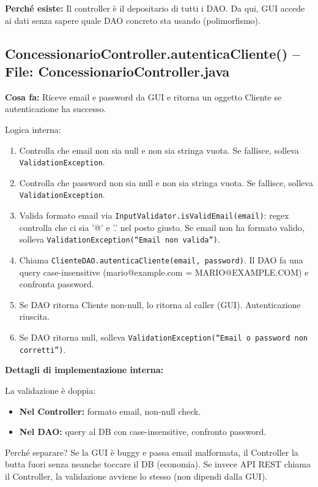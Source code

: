 \documentclass[12pt,a4paper]{article}
\begin{document}
\textbf{Perché esiste:}
Il controller è il depositario di tutti i DAO. Da qui, GUI accede ai dati senza sapere quale DAO concreto sta usando (polimorfismo).

\subsection{ConcessionarioController.autenticaCliente() -- File: ConcessionarioController.java}

\textbf{Cosa fa:}
Riceve email e password da GUI e ritorna un oggetto Cliente se autenticazione ha successo.

Logica interna:
\begin{enumerate}
  \item Controlla che email non sia null e non sia stringa vuota. Se fallisce, solleva \texttt{ValidationException}.
  \item Controlla che password non sia null e non sia stringa vuota. Se fallisce, solleva \texttt{ValidationException}.
  \item Valida formato email via \texttt{InputValidator.isValidEmail(email)}: regex controlla che ci sia '@' e '.' nel posto giusto.
    Se email non ha formato valido, solleva \texttt{ValidationException(``Email non valida'')}.
  \item Chiama \texttt{ClienteDAO.autenticaCliente(email, password)}.
    Il DAO fa una query case-insensitive (mario@example.com = MARIO@EXAMPLE.COM) e confronta password.
  \item Se DAO ritorna Cliente non-null, lo ritorna al caller (GUI). Autenticazione riuscita.
  \item Se DAO ritorna null, solleva \texttt{ValidationException(``Email o password non corretti'')}.
\end{enumerate}

\textbf{Dettagli di implementazione interna:}

La validazione è doppia:
\begin{itemize}
  \item \textbf{Nel Controller:} formato email, non-null check.
  \item \textbf{Nel DAO:} query al DB con case-insensitive, confronto password.
\end{itemize}

Perché separare? Se la GUI è buggy e passa email malformata, il Controller la butta fuori senza neanche toccare il DB (economia).
Se invece API REST chiama il Controller, la validazione avviene lo stesso (non dipendi dalla GUI).
\end{document}
